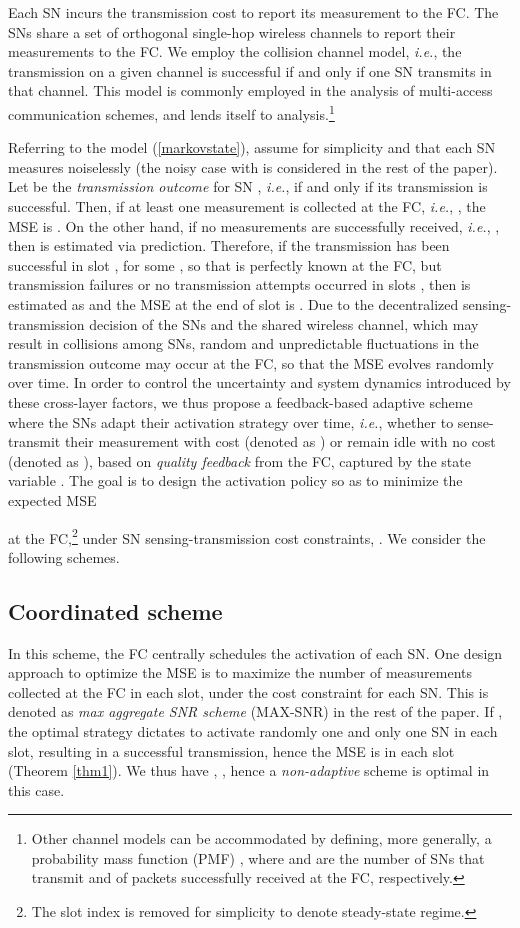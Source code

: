 \documentclass[10pt,twocolumn,twoside]{IEEEtran}
\theoremstyle{plain}
\begin{document}
Each SN incurs the transmission cost  to report its measurement to the FC.
   The  SNs share 
 a set of  orthogonal single-hop wireless channels to report their measurements to the FC.
 We employ the collision channel model, \emph{i.e.},
 the transmission on a given channel is successful if and only if one SN transmits in that channel. 
 This model is commonly employed in the analysis of multi-access communication schemes,
and lends itself to analysis.\footnote{Other channel models can be accommodated by defining, more generally, a probability mass function (PMF) , where
  and  are the number of SNs that transmit and of packets successfully received at the FC, respectively.}
 
Referring to the model (\ref{markovstate}),
 assume for simplicity 
 and that each SN measures  noiselessly (the noisy case with  is considered in the rest of the paper).
   Let  be the \emph{transmission outcome} for SN , \emph{i.e.},  if and only if its transmission is successful. 
    Then, if at least one measurement is collected at the FC, \emph{i.e.}, ,
 the MSE is . On the other hand, if no measurements are successfully received, \emph{i.e.}, , then
 is estimated via prediction. Therefore, if the transmission has been successful in slot , for some ,
so that  is perfectly known at the FC,
 but transmission failures or no transmission attempts occurred in slots , then  is estimated as  and
 the MSE at the end of slot  is .
 Due to the decentralized sensing-transmission decision of the SNs and the
  shared wireless channel, which may result in collisions among SNs, random and unpredictable fluctuations in the transmission outcome  may occur at the FC,
  so that the MSE evolves randomly over time. In order to control the uncertainty and system dynamics introduced by these cross-layer factors, we thus propose a
  feedback-based adaptive  scheme where
 the SNs adapt their activation strategy over time, \emph{i.e.}, whether to sense-transmit their measurement with cost  (denoted as ) or remain idle 
 with no cost (denoted as ), based on \emph{quality feedback} from the FC, captured by the state variable .
 The goal is to design the activation policy so as to minimize the expected MSE

 at the FC,\footnote{The slot index  is removed for simplicity to denote steady-state regime.}
under SN sensing-transmission cost constraints, .
We consider the following schemes.
\vspace{-3mm}
\subsection{Coordinated scheme}
\label{coordscheme}
 In this scheme, the FC centrally schedules the activation  of  each SN.
One design approach to optimize the MSE
is to maximize the number of measurements collected at the FC in each slot, under the cost constraint for each SN.
This is denoted as \emph{max aggregate SNR scheme} (MAX-SNR) in the rest of the paper.
If , the optimal strategy dictates to activate randomly one and only one SN in each slot,
resulting in a successful transmission, hence the MSE is  in each slot (Theorem \ref{thm1}). We thus have
 , , hence
 a \emph{non-adaptive} scheme is optimal in this case.
 \vspace{-3mm}
\end{document}
